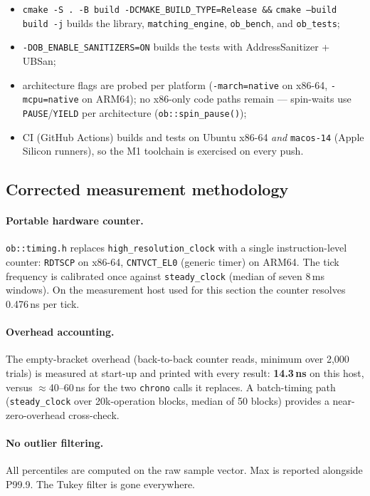\documentclass[11pt,a4paper]{article}
\begin{document}
\begin{itemize}
\item \texttt{cmake -S . -B build -DCMAKE\_BUILD\_TYPE=Release \&\&}
      \texttt{cmake --build build -j} builds the library,
      \texttt{matching\_engine}, \texttt{ob\_bench}, and \texttt{ob\_tests};
\item \texttt{-DOB\_ENABLE\_SANITIZERS=ON} builds the tests with
      AddressSanitizer + UBSan;
\item architecture flags are probed per platform
      (\texttt{-march=native} on x86-64, \texttt{-mcpu=native} on ARM64);
      no x86-only code paths remain --- spin-waits use
      \texttt{PAUSE}/\texttt{YIELD} per architecture
      (\texttt{ob::spin\_pause()});
\item CI (GitHub Actions) builds and tests on Ubuntu x86-64 \emph{and}
      \texttt{macos-14} (Apple Silicon runners), so the M1 toolchain is
      exercised on every push.
\end{itemize}

\subsection{Corrected measurement methodology}\label{sec:methodology}

\paragraph{Portable hardware counter.} \texttt{ob::timing.h} replaces
\texttt{high\_resolution\_clock} with a single instruction-level counter:
\texttt{RDTSCP} on x86-64, \texttt{CNTVCT\_EL0} (generic timer) on ARM64.
The tick frequency is calibrated once against \texttt{steady\_clock}
(median of seven 8\,ms windows). On the measurement host used for this
section the counter resolves 0.476\,ns per tick.

\paragraph{Overhead accounting.} The empty-bracket overhead (back-to-back
counter reads, minimum over 2{,}000 trials) is measured at start-up and
printed with every result: \textbf{14.3\,ns} on this host, versus
$\approx$40--60\,ns for the two \texttt{chrono} calls it replaces. A
batch-timing path (\texttt{steady\_clock} over 20k-operation blocks,
median of 50 blocks) provides a near-zero-overhead cross-check.

\paragraph{No outlier filtering.} All percentiles are computed on the raw
sample vector. Max is reported alongside P99.9. The Tukey filter is gone
everywhere.
\end{document}
